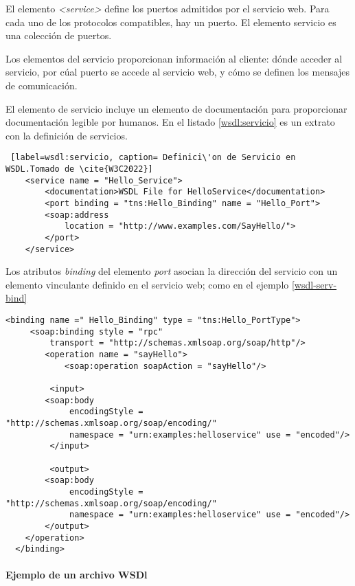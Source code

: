   El elemento \textit{<service>} define los puertos admitidos por el servicio web. Para cada uno de los protocolos compatibles, hay un puerto. El elemento  servicio es una colección de puertos.
  
  Los elementos del servicio proporcionan informaci\'on al cliente:   dónde acceder al servicio, por  c\'ual puerto se accede al servicio web, y
  cómo se definen los mensajes de comunicación.
  
  El elemento de servicio incluye un elemento de documentación para proporcionar documentación legible por humanos. En el listado \ref{wsdl:servicio} es un extrato con la definici\'on de servicios. 
  
  \begin{lstlisting} [label=wsdl:servicio, caption= Definici\'on de Servicio en WSDL.Tomado de \cite{W3C2022}]
  	<service name = "Hello_Service">
  		<documentation>WSDL File for HelloService</documentation>
	  	<port binding = "tns:Hello_Binding" name = "Hello_Port">
	  	<soap:address
 		 	location = "http://www.examples.com/SayHello/">
  		</port>
  	</service>
   \end{lstlisting}
   
   Los atributos \textit{binding}  del elemento \textit{port} asocian la dirección del servicio con un elemento vinculante definido en el servicio web; como en el ejemplo \ref{wsdl-serv-bind} 
   
   \begin{lstlisting}[label=wsdl-serv-bind, caption=Enlaces y Puertos en la definici\'on de servicios. Tomado de \cite{W3C2022}]
  <binding name =" Hello_Binding" type = "tns:Hello_PortType">
 	 <soap:binding style = "rpc"
 		 transport = "http://schemas.xmlsoap.org/soap/http"/>
  		<operation name = "sayHello">
  			<soap:operation soapAction = "sayHello"/>
  
	 	 <input>
 	 	<soap:body
	 		 encodingStyle = "http://schemas.xmlsoap.org/soap/encoding/"
	 		 namespace = "urn:examples:helloservice" use = "encoded"/>
	 	 </input>
  
	 	 <output>
	  	<soap:body
 			 encodingStyle = "http://schemas.xmlsoap.org/soap/encoding/"
 			 namespace = "urn:examples:helloservice" use = "encoded"/>
  		</output>
  	</operation>
  </binding> 	
   \end{lstlisting}


 
\paragraph{ Ejemplo de un archivo WSDl }

